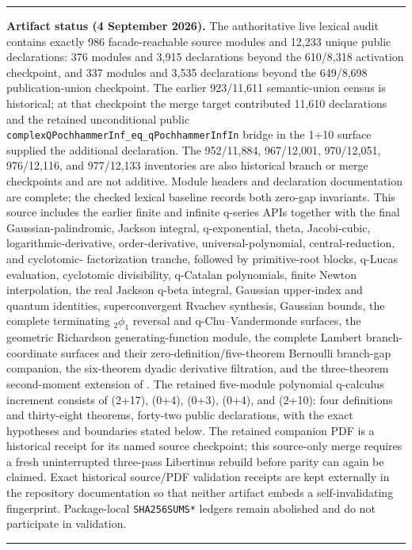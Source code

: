 \documentclass[11pt,oneside]{article}
\theoremstyle{definition}
\theoremstyle{remark}
\newcommand{\lean}[1]{%
  \ifmmode\text{\nolinkurl{#1}}\else\nolinkurl{#1}\fi}
\newenvironment{boxedremark}{%
  \par\smallskip\noindent\begin{center}\begin{minipage}{0.94\textwidth}%
  \color{black}\hrule\vspace{0.6em}\small
}{%
  \vspace{0.6em}\hrule\end{minipage}\end{center}\smallskip
}
\begin{document}
\begin{boxedremark}\textbf{Artifact status (4 September 2026).}\space
The authoritative live lexical audit contains exactly 986 facade-reachable
source modules and 12,233 unique public declarations: 376 modules and 3,915
declarations beyond the 610/8,318 activation checkpoint, and 337 modules and
3,535 declarations beyond the 649/8,698 publication-union checkpoint.  The
earlier 923/11,611 semantic-union census is historical; at that checkpoint the
merge target contributed 11,610 declarations and the retained unconditional
public \lean{complexQPochhammerInf_eq_qPochhammerInfIn} bridge in the 1+10
 surface supplied the additional
declaration.  The 952/11,884, 967/12,001, 970/12,051, 976/12,116, and
977/12,133 inventories are also historical branch or merge checkpoints and
are not additive.  Module headers and declaration documentation are complete;
the checked lexical baseline records both zero-gap invariants.  This source
includes the earlier finite and
infinite q-series APIs together with the final Gaussian-palindromic, Jackson
integral, q-exponential, theta, Jacobi-cubic, logarithmic-derivative,
order-derivative, universal-polynomial, central-reduction, and cyclotomic-
factorization tranche, followed by primitive-root blocks, q-Lucas evaluation,
cyclotomic divisibility, q-Catalan polynomials, finite Newton interpolation,
the real Jackson q-beta integral, Gaussian upper-index and quantum identities,
superconvergent Rvachev synthesis, Gaussian bounds, the complete terminating
\({}_2\phi_1\) reversal and q-Chu--Vandermonde surfaces, the geometric
Richardson generating-function module, the complete Lambert branch-coordinate
surfaces and their zero-definition/five-theorem Bernoulli branch-gap
companion, the six-theorem dyadic derivative filtration, and the three-theorem
second-moment extension of .  The retained
five-module polynomial q-calculus increment consists of
 (2+17),
 (0+4),
 (0+3),
 (0+4), and  (2+10): four
definitions and thirty-eight theorems, forty-two public declarations, with the
exact hypotheses and boundaries stated below.  The retained companion PDF is
a historical receipt for its named source checkpoint; this source-only merge
requires a fresh uninterrupted three-pass Libertinus rebuild before parity can
again be claimed.  Exact historical source/PDF validation receipts are kept
externally in the repository documentation so that neither artifact embeds a
self-invalidating fingerprint.  Package-local \nolinkurl{SHA256SUMS*} ledgers
remain abolished and do not participate in validation.
\end{boxedremark}
\end{document}

